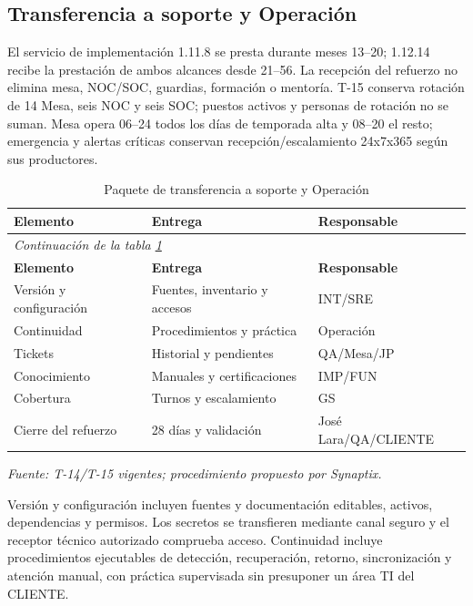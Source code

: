 \subsection{Transferencia a soporte y Operación}
El servicio de implementación 1.11.8 se presta durante meses 13--20; 1.12.14 recibe la prestación de ambos alcances desde 21--56. La recepción del refuerzo no elimina mesa, NOC/SOC, guardias, formación o mentoría. T-15 conserva rotación de 14 Mesa, seis NOC y seis SOC; puestos activos y personas de rotación no se suman. Mesa opera 06--24 todos los días de temporada alta y 08--20 el resto; emergencia y alertas críticas conservan recepción/escalamiento 24x7x365 según sus productores.

\begingroup\small\setlength{\tabcolsep}{3pt}
\begin{longtable}{p{}p{}p{}}
\caption{Paquete de transferencia a soporte y Operación}\label{tab:t18-transferencia}\\\hline
\textbf{Elemento} & \textbf{Entrega} & \textbf{Responsable}\\\hline\endfirsthead
\multicolumn{3}{l}{\textit{Continuación de la tabla \ref{tab:t18-transferencia}}}\\\hline
\textbf{Elemento} & \textbf{Entrega} & \textbf{Responsable}\\\hline\endhead
\hline\endfoot\hline\endlastfoot
Versión y configuración & Fuentes, inventario y accesos & INT/SRE\\\hline
Continuidad & Procedimientos y práctica & Operación\\\hline
Tickets & Historial y pendientes & QA/Mesa/JP\\\hline
Conocimiento & Manuales y certificaciones & IMP/FUN\\\hline
Cobertura & Turnos y escalamiento & GS\\\hline
Cierre del refuerzo & 28 días y validación & José Lara/QA/CLIENTE\\\hline
\end{longtable}\endgroup
\noindent\textit{Fuente: T-14/T-15 vigentes; procedimiento propuesto por Synaptix.}

Versión y configuración incluyen fuentes y documentación editables, activos, dependencias y permisos. Los secretos se transfieren mediante canal seguro y el receptor técnico autorizado comprueba acceso. Continuidad incluye procedimientos ejecutables de detección, recuperación, retorno, sincronización y atención manual, con práctica supervisada sin presuponer un área TI del CLIENTE.

